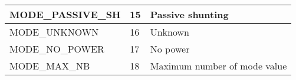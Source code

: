 \documentclass{template/openetcs_article}
\begin{document}
\begin{longtable}{|l|l|l|}
	\hline
		\begin{minipage}[t]{0.45\linewidth} MODE\_PASSIVE\_SH	\end{minipage}
	&	\begin{minipage}[t]{0.15\linewidth} 15	\end{minipage} 
	&	\begin{minipage}[t]{0.45\linewidth} Passive shunting	\end{minipage} \\
	\hline
		\begin{minipage}[t]{0.45\linewidth} MODE\_UNKNOWN	\end{minipage}
	&	\begin{minipage}[t]{0.15\linewidth} 16	\end{minipage} 
	&	\begin{minipage}[t]{0.45\linewidth} Unknown	\end{minipage} \\
	\hline
		\begin{minipage}[t]{0.45\linewidth} MODE\_NO\_POWER	\end{minipage}
	&	\begin{minipage}[t]{0.15\linewidth} 17	\end{minipage} 
	&	\begin{minipage}[t]{0.45\linewidth} No power	\end{minipage} \\
	\hline
		\begin{minipage}[t]{0.45\linewidth} MODE\_MAX\_NB	\end{minipage}
	&	\begin{minipage}[t]{0.15\linewidth} 18	\end{minipage} 
	&	\begin{minipage}[t]{0.45\linewidth} Maximum number of mode value	\end{minipage} \\
	\hline
\end{longtable}
\end{document}
